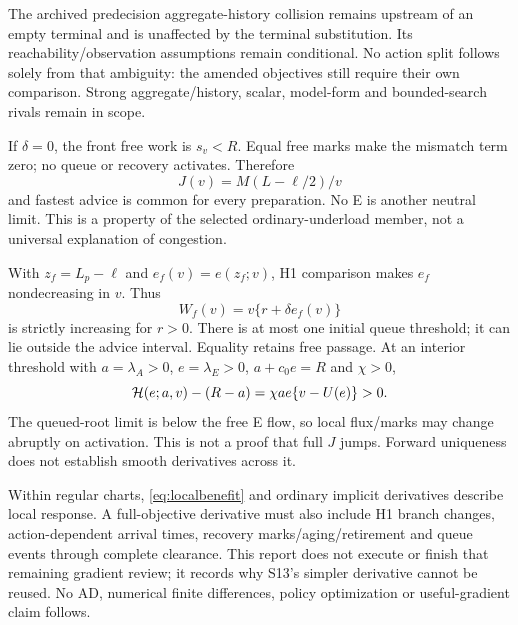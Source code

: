 The archived predecision aggregate-history collision remains upstream of
an empty terminal and is unaffected by the terminal substitution. Its
reachability/observation assumptions remain conditional. No action split
follows solely from that ambiguity: the amended objectives still require
their own comparison. Strong aggregate/history, scalar, model-form and
bounded-search rivals remain in scope.

If $\delta=0$, the front free work is $s_v<R$. Equal free marks make the
mismatch term zero; no queue or recovery activates. Therefore
\begin{equation}
 J(v)=M(L-\ell/2)/v \label{eq:negativecontrol}
\end{equation}
and fastest advice is common for every preparation. No E is another
neutral limit. This is a property of the selected ordinary-underload
member, not a universal explanation of congestion.

With $z_f=L_p-\ell$ and $e_f(v)=e(z_f;v)$, H1 comparison makes $e_f$
nondecreasing in $v$. Thus
\begin{equation}
 W_f(v)=v\{r+\delta e_f(v)\} \label{eq:frontthreshold}
\end{equation}
is strictly increasing for $r>0$. There is at most one initial queue
threshold; it can lie outside the advice interval. Equality retains free
passage. At an interior threshold with $a=\lambda_A>0$,
$e=\lambda_E>0$, $a+c_0e=R$ and $\chi>0$,
\begin{equation}
 \mathcal H(e;a,v)-(R-a)=\chi a e\{v-U(e)\}>0. \label{eq:fluxgap}
\end{equation}
The queued-root limit is below the free E flow, so local flux/marks may
change abruptly on activation. This is not a proof that full $J$ jumps.
Forward uniqueness does not establish smooth derivatives across it.

Within regular charts, \eqref{eq:localbenefit} and ordinary implicit
derivatives describe local response. A full-objective derivative must
also include H1 branch changes, action-dependent arrival times, recovery
marks/aging/retirement and queue events through complete clearance. This
report does not execute or finish that remaining gradient review; it
records why S13's simpler derivative cannot be reused. No AD, numerical
finite differences, policy optimization or useful-gradient claim follows.
